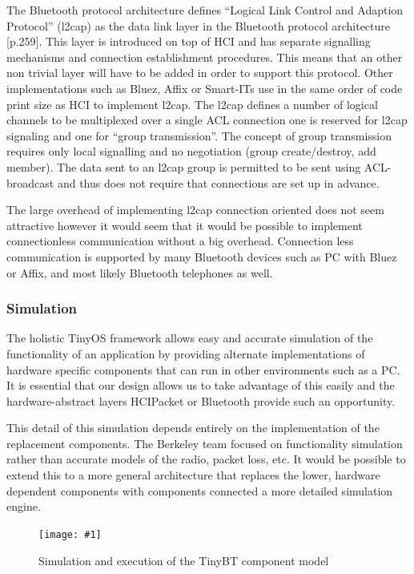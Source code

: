 \documentclass[a4paper,10pt]{article}
\newcommand{\floatfigure}[4]{ %
  \begin{figure}[ptb]
    \begin{center}
      \leavevmode %
      \texttt{[image: \#1]}        
      \caption{#3}
      \label{#4}
    \end{center}
  \end{figure}
}
\begin{document}
The Bluetooth protocol architecture defines ``Logical Link Control and
Adaption Protocol'' (l2cap) as the data link layer in the Bluetooth
protocol architecture \cite{BT02}[p.259]. This layer is introduced on
top of HCI and has separate signalling mechanisms and connection
establishment procedures. This means that an other non trivial layer
will have to be added in order to support this protocol. Other
implementations such as Bluez, Affix or Smart-ITs use in the same
order of code print size as HCI to implement l2cap. The l2cap defines
a number of logical channels to be multiplexed over a single ACL
connection one is reserved for l2cap signaling and one for ``group
transmission''. The concept of group transmission requires only local
signalling and no negotiation (group create/destroy, add member). The
data sent to an l2cap group is permitted to be sent using
ACL-broadcast and thus does not require that connections are set up in
advance.

The large overhead of implementing l2cap connection oriented does not
seem attractive however it would seem that it would be possible to
implement connectionless communication without a big overhead.
Connection less communication is supported by many Bluetooth devices
such as PC with Bluez or Affix, and most likely Bluetooth telephones
as well.

\subsubsection{Simulation}
\label{simulation}
The holistic TinyOS framework allows easy and accurate simulation of
the functionality of an application by providing alternate
implementations of hardware specific components that can run in other
environments such as a PC. It is essential that our design allows us
to take advantage of this easily and the hardware-abstract layers
HCIPacket or Bluetooth provide such an opportunity.

This detail of this simulation depends entirely on the implementation
of the replacement components. The Berkeley team focused on
functionality simulation rather than accurate models of the radio,
packet loss, etc. It would be possible to extend this to a more
general architecture that replaces the lower, hardware dependent
components with components connected a more detailed simulation
engine.

\floatfigure{tinyBTarch}{width=0.35\textwidth}
{Simulation and execution of the TinyBT component model}{fig:tinybtarch}
\end{document}
